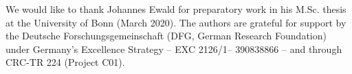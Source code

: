 
We would like to thank Johannes Ewald for preparatory work in his M.Sc. thesis at the
University of Bonn (March 2020). The authors are grateful for support by the Deutsche
Forschungsgemeinschaft (DFG, German Research Foundation) under Germany's Excellence
Strategy – EXC 2126/1– 390838866 – and through CRC-TR 224 (Project C01).
